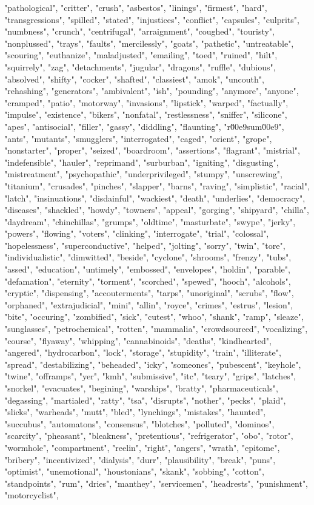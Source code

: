 "pathological", "critter", "crush", "asbestos", "linings", "firmest", "hard", "transgressions", "spilled", "stated", "injustices", "conflict", "capsules", "culprits", "numbness", "crunch", "centrifugal", "arraignment", "coughed", "touristy", "nonplussed", "trays", "faults", "mercilessly", "goats", "pathetic", "untreatable", "scouring", "euthanize", "maladjusted", "emailing", "toed", "ruined", "hilt", "squirrely", "zag", "detachments", "jugular", "dragons", "ruffle", "dubious", "absolved", "shifty", "cocker", "shafted", "classiest", "amok", "uncouth", "rehashing", "generators", "ambivalent", "ish", "pounding", "anymore", "anyone", "cramped", "patio", "motorway", "invasions", "lipstick", "warped", "factually", "impulse", "existence", "bikers", "nonfatal", "restlessness", "sniffer", "silicone", "apes", "antisocial", "filler", "gassy", "diddling", "flaunting", "r\u00e9sum\u00e9", "ants", "mutants", "smugglers", "interrogated", "caged", "orient", "grope", "nonstarter", "proper", "seized", "boardroom", "assertions", "flagrant", "mistrial", "indefensible", "hauler", "reprimand", "surburban", "igniting", "disgusting", "mistreatment", "psychopathic", "underprivileged", "stumpy", "unscrewing", "titanium", "crusades", "pinches", "slapper", "barns", "raving", "simplistic", "racial", "latch", "insinuations", "disdainful", "wackiest", "death", "underlies", "democracy", "diseases", "shackled", "howdy", "towners", "appeal", "gorging", "shipyard", "chilla", "daydream", "chinchillas", "grumps", "oldtime", "masturbate", "swype", "jerky", "powers", "flowing", "voters", "clinking", "interrogate", "trial", "colossal", "hopelessness", "superconductive", "helped", "jolting", "sorry", "twin", "tore", "individualistic", "dimwitted", "beside", "cyclone", "shrooms", "frenzy", "tubs", "assed", "education", "untimely", "embossed", "envelopes", "holdin", "parable", "defamation", "eternity", "torment", "scorched", "spewed", "hooch", "alcohols", "cryptic", "dispensing", "accouterments", "tarps", "unoriginal", "scrubs", "flow", "orphaned", "extrajudicial", "mini", "allin", "royce", "crimes", "estrus", "lesion", "bite", "occuring", "zombified", "sick", "cutest", "whoo", "shank", "ramp", "sleaze", "sunglasses", "petrochemical", "rotten", "mammalia", "crowdsourced", "vocalizing", "course", "flyaway", "whipping", "cannabinoids", "deaths", "kindhearted", "angered", "hydrocarbon", "lock", "storage", "stupidity", "train", "illiterate", "spread", "destabilizing", "beheaded", "icky", "someones", "pubescent", "keyhole", "twine", "offramps", "yer", "kmh", "submissive", "itc", "teary", "grips", "latches", "snorkel", "evacuates", "begining", "warships", "bratty", "pharmaceuticals", "degassing", "martialed", "ratty", "tsa", "disrupts", "nother", "pecks", "plaid", "slicks", "warheads", "mutt", "bled", "lynchings", "mistakes", "haunted", "succubus", "automatons", "consensus", "blotches", "polluted", "dominos", "scarcity", "pheasant", "bleakness", "pretentious", "refrigerator", "obo", "rotor", "wormhole", "compartment", "reelin", "right", "angers", "wrath", "epitome", "bribery", "incentivized", "dialysis", "durr", "plausibility", "break", "puns", "optimist", "unemotional", "houstonians", "skank", "sobbing", "cotton", "standpoints", "rum", "dries", "manthey", "servicemen", "headrests", "punishment", "motorcyclist", 
